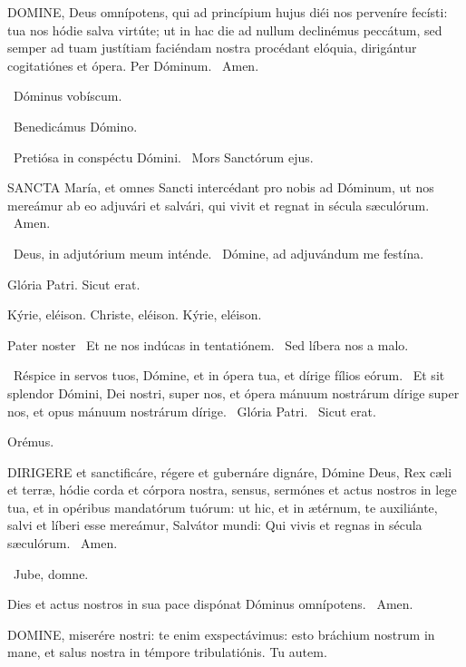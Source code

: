 \lettrine[lines=2]{D}{OMINE}, Deus omnípotens, qui ad princípium hujus diéi nos perveníre fecísti: tua nos hódie salva virtúte; ut in hac die ad nullum declinémus peccátum, sed semper ad tuam justítiam faciéndam nostra procédant elóquia, dirigántur cogitatiónes et ópera. Per Dóminum. \R\ Amen.

\V\ Dóminus vobíscum.

\V\ Benedicámus Dómino.


\V\ Pretiósa in conspéctu Dómini. \R\ Mors Sanctórum ejus.



\lettrine[lines=2]{S}{ANCTA} María, et omnes Sancti intercédant pro nobis ad Dóminum, ut nos mereámur ab eo adjuvári et salvári, qui vivit et regnat in sécula sæculórum. \R\ Amen.

\V\ Deus, in adjutórium meum inténde. \R\ Dómine, ad adjuvándum me festína.

 Glória Patri. Sicut erat.

Kýrie, eléison. Christe, eléison. Kýrie, eléison.

Pater noster  \V\ Et ne nos indúcas in tentatiónem. \R\ Sed líbera nos a malo.

\V\ Réspice in servos tuos, Dómine, et in ópera tua, et dírige fílios eórum. \R\ Et sit splendor Dómini, Dei nostri, super nos, et ópera mánuum nostrárum dírige super nos, et opus mánuum nostrárum dírige. \V\ Glória Patri. \R\ Sicut erat.

Orémus. 

\lettrine[lines=2]{D}{IRIGERE} et sanctificáre, régere et gubernáre dignáre, Dómine Deus, Rex cæli et terræ, hódie corda et córpora nostra, sensus, sermónes et actus nostros in lege tua, et in opéribus mandatórum tuórum: ut hic, et in ætérnum, te auxiliánte, salvi et líberi esse mereámur, Salvátor mundi: Qui vivis et regnas in sécula sæculórum. \R\ Amen.

\V\ Jube, domne.

 Dies et actus nostros in sua pace dispónat Dóminus omnípotens. \R\ Amen.



\lettrine[lines=2]{D}{OMINE}, miserére nostri: te enim exspectávimus: esto bráchium nostrum in mane, et salus nostra in témpore tribulatiónis. Tu autem.

